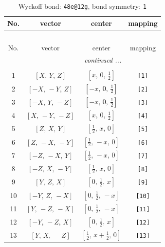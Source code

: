 \documentclass[fleqn,8pt]{jsarticle}
\begin{document}
\begin{longtable}{cccc}
\caption{Wyckoff bond: {\tt 48e@12g}, bond symmetry: {\tt 1}}
 \\
 \hline \hline
No. & vector & center & mapping \\ \hline \endfirsthead

\multicolumn{3}{l}{\tablename\ \thetable{}} \\
 \hline \hline
No. & vector & center & mapping \\ \hline \endhead

 \hline \hline
\multicolumn{3}{r}{\footnotesize\it continued ...} \\ \endfoot

 \hline \hline
\multicolumn{3}{r}{} \\ \endlastfoot

1 & $\left[ X,\, Y,\, Z \right]$ & $\left[ x,\, 0,\, \frac{1}{2} \right]$ & {\tt [1]} \\ \hline
2 & $\left[ - X,\, - Y,\, Z \right]$ & $\left[ - x,\, 0,\, \frac{1}{2} \right]$ & {\tt [2]} \\ \hline
3 & $\left[ - X,\, Y,\, - Z \right]$ & $\left[ - x,\, 0,\, \frac{1}{2} \right]$ & {\tt [3]} \\ \hline
4 & $\left[ X,\, - Y,\, - Z \right]$ & $\left[ x,\, 0,\, \frac{1}{2} \right]$ & {\tt [4]} \\ \hline
5 & $\left[ Z,\, X,\, Y \right]$ & $\left[ \frac{1}{2},\, x,\, 0 \right]$ & {\tt [5]} \\ \hline
6 & $\left[ Z,\, - X,\, - Y \right]$ & $\left[ \frac{1}{2},\, - x,\, 0 \right]$ & {\tt [6]} \\ \hline
7 & $\left[ - Z,\, - X,\, Y \right]$ & $\left[ \frac{1}{2},\, - x,\, 0 \right]$ & {\tt [7]} \\ \hline
8 & $\left[ - Z,\, X,\, - Y \right]$ & $\left[ \frac{1}{2},\, x,\, 0 \right]$ & {\tt [8]} \\ \hline
9 & $\left[ Y,\, Z,\, X \right]$ & $\left[ 0,\, \frac{1}{2},\, x \right]$ & {\tt [9]} \\ \hline
10 & $\left[ - Y,\, Z,\, - X \right]$ & $\left[ 0,\, \frac{1}{2},\, - x \right]$ & {\tt [10]} \\ \hline
11 & $\left[ Y,\, - Z,\, - X \right]$ & $\left[ 0,\, \frac{1}{2},\, - x \right]$ & {\tt [11]} \\ \hline
12 & $\left[ - Y,\, - Z,\, X \right]$ & $\left[ 0,\, \frac{1}{2},\, x \right]$ & {\tt [12]} \\ \hline
13 & $\left[ Y,\, X,\, - Z \right]$ & $\left[ \frac{1}{2},\, x + \frac{1}{2},\, 0 \right]$ & {\tt [13]} \\ \hline

\end{longtable}
\end{document}
